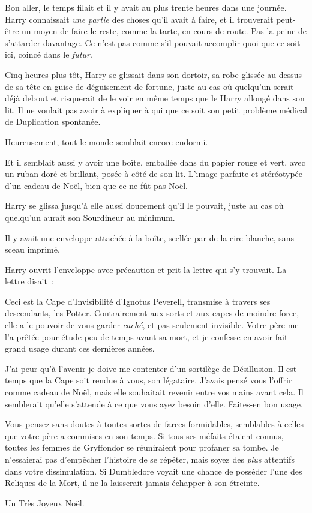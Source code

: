 Bon aller, le temps filait et il y avait au plus trente heures dans une journée. Harry connaissait \emph{une partie} des choses qu'il avait à faire, et il trouverait peut-être un moyen de faire le reste, comme la tarte, en cours de route. Pas la peine de s'attarder davantage. Ce n'est pas comme s'il pouvait accomplir quoi que ce soit ici, coincé dans le \emph{futur}.

\later


Cinq heures plus tôt, Harry se glissait dans son dortoir, sa robe glissée au-dessus de sa tête en guise de déguisement de fortune, juste au cas où quelqu'un serait déjà debout et risquerait de le voir en même temps que le Harry allongé dans son lit. Il ne voulait pas avoir à expliquer à qui que ce soit son petit problème médical de Duplication spontanée.

Heureusement, tout le monde semblait encore endormi.

Et il semblait aussi y avoir une boîte, emballée dans du papier rouge et vert, avec un ruban doré et brillant, posée à côté de son lit. L'image parfaite et stéréotypée d'un cadeau de Noël, bien que ce ne fût pas Noël.

Harry se glissa jusqu'à elle aussi doucement qu'il le pouvait, juste au cas où quelqu'un aurait son Sourdineur au minimum.

Il y avait une enveloppe attachée à la boîte, scellée par de la cire blanche, sans sceau imprimé.

Harry ouvrit l'enveloppe avec précaution et prit la lettre qui s'y trouvait. La lettre disait~:
\begin{writtenNote}

Ceci est la Cape d'Invisibilité d'Ignotus Peverell, transmise à travers ses descendants, les Potter. Contrairement aux sorts et aux capes de moindre force, elle a le pouvoir de vous garder \emph{caché}, et pas seulement invisible. Votre père me l'a prêtée pour étude peu de temps avant sa mort, et je confesse en avoir fait grand usage durant ces dernières années.

J'ai peur qu'à l'avenir je doive me contenter d'un sortilège de Désillusion. Il est temps que la Cape soit rendue à vous, son légataire. J'avais pensé vous l'offrir comme cadeau de Noël, mais elle souhaitait revenir entre vos mains avant cela. Il semblerait qu'elle s'attende à ce que vous ayez besoin d'elle. Faites-en bon usage.

Vous pensez sans doutes à toutes sortes de farces formidables, semblables à celles que votre père a commises en son temps. Si tous ses méfaits étaient connus, toutes les femmes de Gryffondor se réuniraient pour profaner sa tombe. Je n'essaierai pas d'empêcher l'histoire de se répéter, mais soyez des \emph{plus} attentifs dans votre dissimulation. Si Dumbledore voyait une chance de posséder l'une des Reliques de la Mort, il ne la laisserait jamais échapper à son étreinte.

Un Très Joyeux Noël.

\end{writtenNote}

